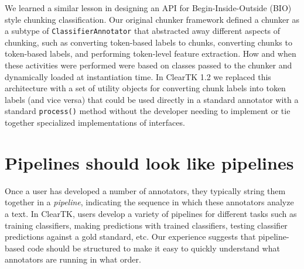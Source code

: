 \documentclass[10pt, a4paper]{article}
\newcommand{\code}[1]{\texttt{\small #1}}
\begin{document}
We learned a similar lesson in designing an API for Begin-Inside-Outside (BIO) style chunking classification.
Our original chunker framework defined a chunker as a subtype of \code{ClassifierAnnotator} that abstracted away different aspects of chunking, such as converting token-based labels to chunks, converting chunks to token-based labels, and performing token-level feature extraction.
How and when these activities were performed were based on classes passed to the chunker and dynamically loaded at instantiation time.
In ClearTK 1.2 we replaced this architecture with a set of utility objects for converting chunk labels into token labels (and vice versa) that could be used directly in a standard annotator with a standard \code{process()} method without the developer needing to implement or tie together specialized implementations of interfaces.  


\section{Pipelines should look like pipelines}
Once a user has developed a number of annotators, they typically string them together in a \emph{pipeline}, indicating the sequence in which these annotators analyze a text.
In ClearTK, users develop a variety of pipelines for different tasks such as training classifiers, making predictions with trained classifiers, testing classifier predictions against a gold standard, etc.  Our experience suggests that pipeline-based code should be structured to make it easy to quickly understand what annotators are running in what order.
\end{document}
